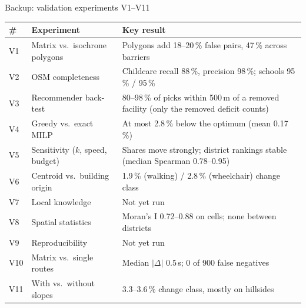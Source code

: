 \documentclass[aspectratio=169,10pt]{beamer}
\begin{document}
\begin{frame}{Backup: validation experiments V1--V11}
  \scriptsize
  \begin{tabular}{@{}llP{95mm}@{}}
    \toprule
    \# & Experiment & Key result \\
    \midrule
    V1 & Matrix vs.\ isochrone polygons & Polygons add 18--20\,\% false pairs, 47\,\% across barriers \\
    V2 & OSM completeness & Childcare recall 88\,\%, precision 98\,\%; schools 95\,\% / 95\,\% \\
    V3 & Recommender back-test & 80--98\,\% of picks within 500\,m of a removed facility (only the removed deficit counts) \\
    V4 & Greedy vs.\ exact MILP & At most 2.8\,\% below the optimum (mean 0.17\,\%) \\
    V5 & Sensitivity ($k$, speed, budget) & Shares move strongly; district rankings stable
      (median Spearman 0.78--0.95) \\
    V6 & Centroid vs.\ building origin & 1.9\,\% (walking) / 2.8\,\% (wheelchair) change class \\
    V7 & Local knowledge & Not yet run \\
    V8 & Spatial statistics & Moran's I 0.72--0.88 on cells; none between districts \\
    V9 & Reproducibility & Not yet run \\
    V10 & Matrix vs.\ single routes & Median $|\Delta|$ 0.5\,s; 0 of 900 false negatives \\
    V11 & With vs.\ without slopes & 3.3--3.6\,\% change class, mostly on hillsides \\
    \bottomrule
  \end{tabular}
\end{frame}
\end{document}
